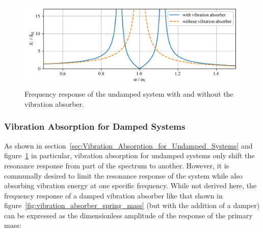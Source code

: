\documentclass[12pt,letter]{article}
\begin{document}
\begin{figure}[H]
    \centering
    \includegraphics[width=6.5in]{../figures/vibration_absorber_undamped_results.png}
    \caption{Frequency response of the undamped system with and without the vibration absorber.}
    \label{fig:vibration_absorber_undamped_results}
\end{figure}



\subsubsection{Vibration Absorption for Damped Systems}

As shown in section~\ref{sec:Vibration_Absorption_for_Undamped_Systems} and figure~\ref{fig:vibration_absorber_undamped_results} in particular, vibration absorption for undamped systems only shift the resonance response from part of the spectrum to another. However, it is communally desired to limit the resonance response of the system while also absorbing vibration energy at one specific frequency. While not derived here, the frequency response of a damped vibration absorber like that shown in figure~\ref{fig:vibration_absorber_spring_mass} (but with the addition of a damper) can be expressed as the dimensionless amplitude of the response of the primary mass: 
\end{document}
